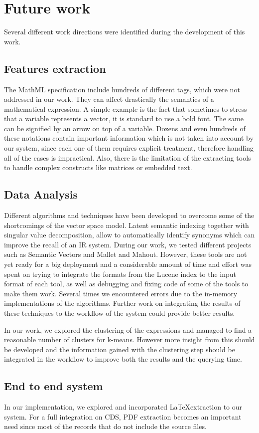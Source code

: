 \chapter{Future work}
\label{chap-future_work}

Several different work directions were identified during the development of this work. 

\section{Features extraction}
The MathML specification include hundreds of different tags, which were not addressed in our work. They can affect drastically the semantics of a mathematical expression. A simple example is the fact that sometimes to stress that a variable represents a vector, it is standard to use a bold font. The same can be signified by an arrow on top of a variable. Dozens and even hundreds of these notations contain important information which is not taken into account by our system, since each one of them requires explicit treatment, therefore handling all of the cases is impractical. Also, there is the limitation of the extracting tools to handle complex constructs like matrices or embedded text.

\section{Data Analysis}
Different algorithms and techniques have been developed to overcome some of the shortcomings of the vector space model. Latent semantic indexing together with singular value decomposition, allow to automatically identify synonyms which can improve the recall of an IR system. During our work, we tested different projects such as Semantic Vectors\cite{semantic_vectors} and Mallet\cite{mallet} and Mahout. However, these tools are not yet ready for a big deployment and a considerable amount of time and effort was spent on trying to integrate the formats from the Lucene index to the input format of each tool, as well as debugging and fixing code of some of the tools to make them work. Several times we encountered errors due to the in-memory implementations of the algorithms. Further work on integrating the results of these techniques to the workflow of the system could provide better results. 

In our work, we explored the clustering of the expressions and managed to find a reasonable number of clusters for k-means. However more insight from this should be developed and the information gained with the clustering step should be integrated in the workflow to improve both the results and the querying time. 

\section{End to end system}
In our implementation, we explored and incorporated \LaTeX extraction to our system. For a full integration on CDS, PDF extraction becomes an important need since most of the records that do not include the source files.
